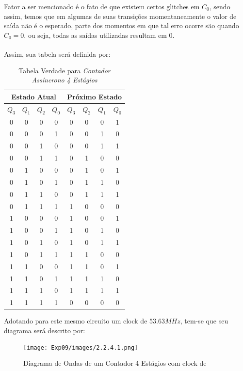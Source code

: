 \documentclass[12pt]{article}
\begin{document}
Fator a ser mencionado é o fato de que existem certos glitches em $C_{0}$, sendo assim, temos que em algumas de suas transições momentaneamente o valor de saída não é o esperado, 
parte dos momentos em que tal erro ocorre são quando $C_{0}=0$, ou seja, todas as saídas utilizadas resultam em 0.\\ \\
Assim, sua tabela será definida por:
\begin{table}[H]
    \centering
    \caption{Tabela Verdade para \emph{Contador Assíncrono 4 Estágios}}
    \begin{tabular}{|c|c|c|c|c|c|c|c|}\hline
      \multicolumn{4}{|c|}{Estado Atual} & \multicolumn{4}{|c|}{Próximo Estado} \\\hline
      \textbf{$Q_{3}$} & \textbf{$Q_{1}$} & \textbf{$Q_{2}$} & \textbf{$Q_{0}$} & \textbf{$Q_{3}$} & \textbf{$Q_{2}$} & \textbf{$Q_{1}$} & \textbf{$Q_{0}$} \\\hline
      0 & 0 & 0 & 0 & 0 & 0 & 0 & 1 \\\hline
      0 & 0 & 0 & 1 & 0 & 0 & 1 & 0 \\\hline
      0 & 0 & 1 & 0 & 0 & 0 & 1 & 1 \\\hline
      0 & 0 & 1 & 1 & 0 & 1 & 0 & 0 \\\hline
      0 & 1 & 0 & 0 & 0 & 1 & 0 & 1 \\\hline
      0 & 1 & 0 & 1 & 0 & 1 & 1 & 0 \\\hline
      0 & 1 & 1 & 0 & 0 & 1 & 1 & 1 \\\hline
      0 & 1 & 1 & 1 & 1 & 0 & 0 & 0 \\\hline
      1 & 0 & 0 & 0 & 1 & 0 & 0 & 1 \\\hline
      1 & 0 & 0 & 1 & 1 & 0 & 1 & 0 \\\hline
      1 & 0 & 1 & 0 & 1 & 0 & 1 & 1 \\\hline
      1 & 0 & 1 & 1 & 1 & 1 & 0 & 0 \\\hline
      1 & 1 & 0 & 0 & 1 & 1 & 0 & 1 \\\hline
      1 & 1 & 0 & 1 & 1 & 1 & 1 & 0 \\\hline
      1 & 1 & 1 & 0 & 1 & 1 & 1 & 1 \\\hline
      1 & 1 & 1 & 1 & 0 & 0 & 0 & 0 \\\hline
    \end{tabular}\label{tab:truth_table_latch_rs_triggered}
\end{table}

Adotando para este mesmo circuito um clock de $53.63MHz$, tem-se que seu diagrama será descrito por:
\begin{figure}[H]
  \centering
  \texttt{[image: Exp09/images/2.2.4.1.png]}
  \caption{Diagrama de Ondas de um Contador 4 Estágios com clock de }\label{2.2.4.1.png}
\end{figure}
\end{document}
